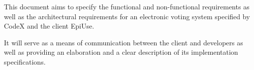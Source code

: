 This document aims to specify the functional and non-functional requirements as well as the architectural requirements for an electronic voting system specified by CodeX and the client EpiUse.

It will serve as a means of communication between the client and developers as well as providing an elaboration and a clear description of its implementation specifications.